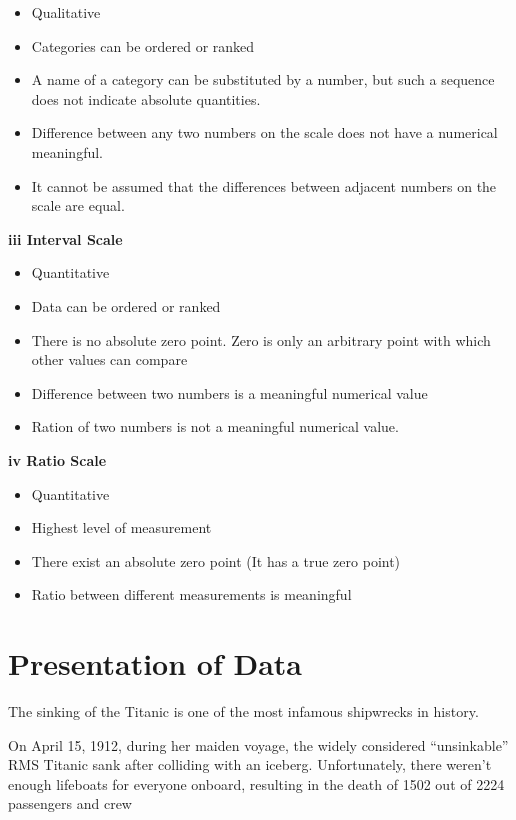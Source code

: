 \documentclass[]{book}
\providecommand{\tightlist}{%
  \setlength{\itemsep}{0pt}\setlength{\parskip}{0pt}}
\begin{document}
\begin{itemize}
\tightlist
\item
  Qualitative
\item
  Categories can be ordered or ranked
\item
  A name of a category can be substituted by a number, but such a sequence does not indicate absolute quantities.
\item
  Difference between any two numbers on the scale does not have a numerical meaningful.
\item
  It cannot be assumed that the differences between adjacent numbers on the scale are equal.
\end{itemize}

\textbf{iii Interval Scale}

\begin{itemize}
\tightlist
\item
  Quantitative
\item
  Data can be ordered or ranked
\item
  There is no absolute zero point. Zero is only an arbitrary point with which other values can compare
\item
  Difference between two numbers is a meaningful numerical value
\item
  Ration of two numbers is not a meaningful numerical value.
\end{itemize}

\textbf{iv Ratio Scale}

\begin{itemize}
\tightlist
\item
  Quantitative
\item
  Highest level of measurement
\item
  There exist an absolute zero point (It has a true zero point)
\item
  Ratio between different measurements is meaningful
\end{itemize}

\newpage

\hypertarget{presentation-of-data}{%
\section{Presentation of Data}\label{presentation-of-data}}

The sinking of the Titanic is one of the most infamous shipwrecks in history.

On April 15, 1912, during her maiden voyage, the widely considered ``unsinkable'' RMS Titanic sank after colliding with an iceberg. Unfortunately, there weren't enough lifeboats for everyone onboard, resulting in the death of 1502 out of 2224 passengers and crew
\end{document}
